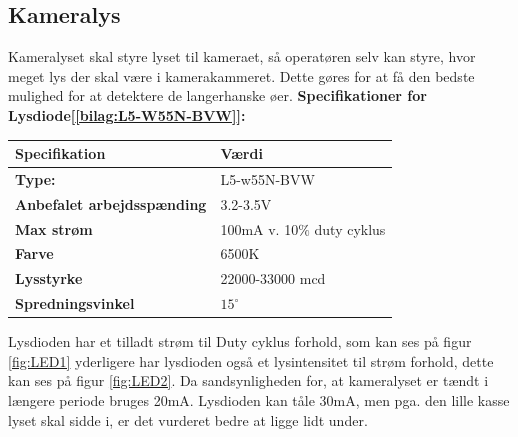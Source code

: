 \subsection{Kameralys}
\label{subsec:kameralys1}
Kameralyset skal styre lyset til kameraet, så operatøren selv kan styre, hvor meget lys der skal være i kamerakammeret. Dette gøres for at få den bedste mulighed for at detektere de langerhanske øer.
\textbf{Specifikationer for Lysdiode[\ref{bilag:L5-W55N-BVW}]:} 
\begin{center}
		\begin{longtable}{ | m{6.5cm} | m{6.5cm}| } 
			\hline
			\textbf{Specifikation} &\textbf{Værdi} \\ 
			\hline
			\textbf{Type:} & L5-w55N-BVW \\ 
			\hline
			\textbf{Anbefalet arbejdsspænding} & 3.2-3.5V \\ 
			\hline
			\textbf{Max strøm} & 100mA v. 10$\%$ duty cyklus \\ 
			\hline
			\textbf{Farve} & 6500K \\ 
			\hline
			\textbf{Lysstyrke} & 22000-33000 mcd \\ 
			\hline
			\textbf{Spredningsvinkel} & $15^{\circ}$ \\ 
			\hline
		\end{longtable}
\end{center}

Lysdioden har et tilladt strøm til Duty cyklus forhold, som kan ses på figur \ref{fig:LED1} yderligere har lysdioden også et lysintensitet til strøm forhold, dette kan ses på figur \ref{fig:LED2}. Da sandsynligheden for, at kameralyset er tændt i længere periode bruges 20mA. Lysdioden kan tåle 30mA, men pga. den lille kasse lyset skal sidde i, er det vurderet bedre at ligge lidt under.

